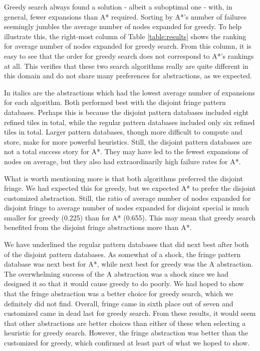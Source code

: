 \documentclass[letterpaper]{article}
\begin{document}
Greedy search always found a solution - albeit a suboptimal one - with, in general, fewer expansions than A* required.  Sorting by A*'s number of failures seemingly jumbles the average number of nodes expanded for greedy.  To help illustrate this, the right-most column of Table \ref{table:results} shows the ranking for average number of nodes expanded for greedy search.  From this column, it is easy to see that the order for greedy search does not correspond to A*'s rankings at all.  This verifies that these two search algorithms really are quite different in this domain and do not share many preferences for abstractions, as we expected.

In italics are the abstractions which had the lowest average number of expansions for each algorithm.  Both performed best with the disjoint fringe pattern databases.  Perhaps this is because the disjoint pattern databases included eight refined tiles in total, while the regular pattern databases included only six refined tiles in total.  Larger pattern databases, though more difficult to compute and store, make for more powerful heuristics.  Still, the disjoint pattern databases are not a total success story for A*.  They may have led to the fewest expansions of nodes on average, but they also had extraordinarily high failure rates for A*.

What is worth mentioning more is that both algorithms preferred the disjoint fringe.  We had expected this for greedy, but we expected A* to prefer the disjoint customized abstraction.  Still, the ratio of average number of nodes expanded for disjoint fringe to average number of nodes expanded for disjoint special is much smaller for greedy (0.225) than for A* (0.655).  This may mean that greedy search benefited from the disjoint fringe abstractions more than A*.

We have underlined the regular pattern databases that did next best after both of the disjoint pattern databases.  As somewhat of a shock, the fringe pattern database was next best for A*, while next best for greedy was the A abstraction.  The overwhelming success of the A abstraction was a shock since we had designed it so that it would cause greedy to do poorly.  We had hoped to show that the fringe abstraction was a better choice for greedy search, which we definitely did not find.  Overall, fringe came in sixth place out of seven and customized came in dead last for greedy search.  From these results, it would seem that other abstractions are better choices than either of these when selecting a heuristic for greedy search.  However, the fringe abstraction was better than the customized for greedy, which confirmed at least part of what we hoped to show.  
\end{document}
